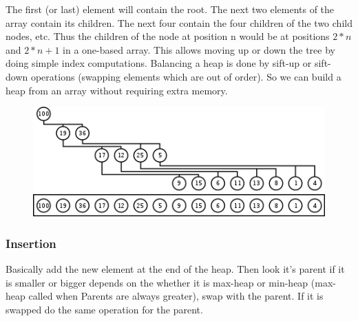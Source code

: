 \documentclass[12pt]{article}
\begin{document}
     The first (or last) element will contain the root. The next two elements of the array contain its children. The next four contain the four children of the two child nodes, etc. Thus the children of the node at position n would be at positions $2*n$ and $2*n + 1$ in a one-based array. This allows moving up or down the tree by doing simple index computations. Balancing a heap is done by sift-up or sift-down operations (swapping elements which are out of order). So we can build a heap from an array without requiring extra memory.

    \begin{figure}
      \centering
      \includegraphics[width=\linewidth]{Heap-as-array.png}
      \label{fig:binary}
    \end{figure}
     
     \subsubsection{Insertion}
        Basically add the new element at the end of the heap. Then look it's parent if it is smaller or bigger depends on the whether it is max-heap or min-heap (max-heap called when Parents are always greater), swap with the parent. If it is swapped do the same operation for the parent.
        
\end{document}
